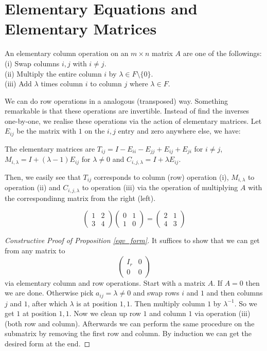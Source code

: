 \section{Elementary Equations and Elementary Matrices}
\begin{definition}
    An elementary column operation on an $m\times n$ matrix $A$ are one of the followings:\\
    (i) Swap columns $i,j$ with $i\neq j$.\\
    (ii) Multiply the entire column $i$ by $\lambda\in F\setminus\{0\}$.\\
    (iii) Add $\lambda$ times column $i$ to column $j$ where $\lambda\in F$.
\end{definition}
We can do row operations in a analogous (transposed) way.
Something remarkable is that these operations are invertible.
Instead of find the inverses one-by-one, we realise these operations via the action of elementary matrices.
Let $E_{ij}$ be the matrix with $1$ on the $i,j$ entry and zero anywhere else, we have:
\begin{definition}
    The elementary matrices are $T_{ij}=I-E_{ii}-E_{jj}+E_{ij}+E_{ji}$ for $i\neq j$, $M_{i,\lambda}=I+(\lambda-1)E_{ij}$ for $\lambda\neq 0$ and $C_{i,j,\lambda}=I+\lambda E_{ij}$.
\end{definition}
Then, we easily see that $T_{ij}$ corresponds to column (row) operation (i), $M_{i,\lambda}$ to operation (ii) and $C_{i,j,\lambda}$ to operation (iii) via the operation of multiplying $A$ with the correspondinng matrix from the right (left).
\begin{example}
    $$\begin{pmatrix}
        1&2\\
        3&4
    \end{pmatrix}\begin{pmatrix}
        0&1\\
        1&0
    \end{pmatrix}=\begin{pmatrix}
        2&1\\
        4&3
    \end{pmatrix}$$
\end{example}
\begin{proof}[Constructive Proof of Proposition \ref{eqv_form}]
    It suffices to show that we can get from any matrix to
    $$\left( \begin{array}{c|c}
        I_r&0\\
        \hline
        0&0
    \end{array} \right)$$
    via elementary column and row operations.
    Start with a matrix $A$.
    If $A=0$ then we are done.
    Otherwise pick $a_{ij}=\lambda\neq 0$ and swap rows $i$ and $1$ and then columns $j$ and $1$, after which $\lambda$ is at position $1,1$.
    Then multiply column $1$ by $\lambda^{-1}$.
    So we get $1$ at position $1,1$.
    Now we clean up row $1$ and column $1$ via operation (iii) (both row and column).
    Afterwards we can perform the same procedure on the submatrix by removing the first row and column.
    By induction we can get the desired form at the end.
\end{proof}
